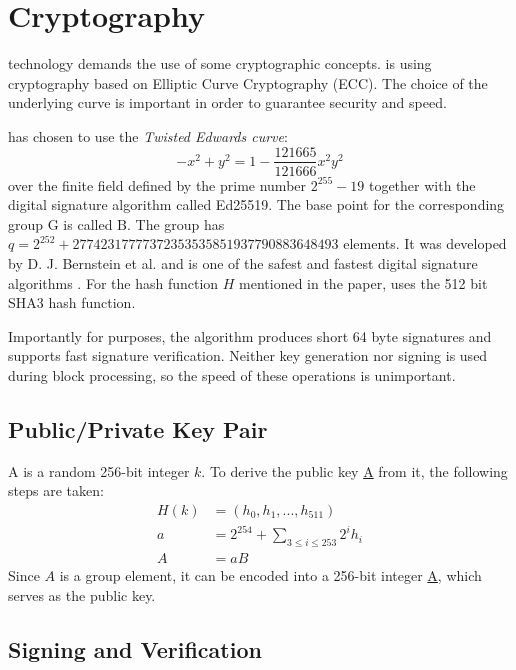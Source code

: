 \section{Cryptography}
\label{sec:cryptography}


 technology demands the use of some cryptographic concepts.
\codenamespace is using cryptography based on Elliptic Curve Cryptography (ECC).
The choice of the underlying curve is important in order to guarantee security and speed.

\codenamespace has chosen to use the \emph{Twisted Edwards curve}:
$$ -x^2 + y^2 = 1 - \frac{121665}{121666} x^2 y^2$$
over the finite field defined by the prime number $2^{255}-19$ together with the digital signature algorithm called Ed25519.
The base point for the corresponding group G is called B. The group has $q=2^{252} + 27742317777372353535851937790883648493$ elements.
It was developed by D. J. Bernstein et al. and is one of the safest and fastest digital signature algorithms \cite{Bernstein2011}.
For the hash function $H$ mentioned in the paper, \codenamespace uses the 512 bit SHA3 hash function.

Importantly for \codenamespace purposes, the algorithm produces short 64 byte signatures and supports fast signature verification.
Neither key generation nor signing is used during block processing, so the speed of these operations is unimportant.

\subsection{Public/Private Key Pair}

A  is a random 256-bit integer $k$. To derive the public key \underline{A} from it, the following steps are taken:
\begin{align}
H(k) &=(h_0, h_1,..., h_{511}) \\
a &= 2^{254} + \sum_{3\leq i \leq 253} 2^i h_i \label{a} \\
A &= aB
\end{align}
Since $A$ is a group element, it can be encoded into a 256-bit integer \underline{A}, which serves as the public key.

\subsection{Signing and Verification}


